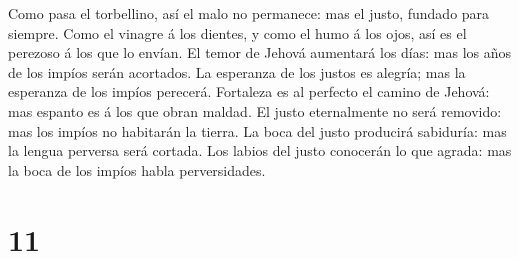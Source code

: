 Como pasa el torbellino, así el malo no permanece: mas el justo, fundado
para siempre.  Como el vinagre á los dientes, y como el
humo á los ojos, así es el perezoso á los que lo envían. 
El temor de Jehová aumentará los días: mas los años de los impíos serán
acortados.  La esperanza de los justos es alegría; mas la
esperanza de los impíos perecerá.  Fortaleza es al
perfecto el camino de Jehová: mas espanto es á los que obran maldad.
 El justo eternalmente no será removido: mas los impíos
no habitarán la tierra.  La boca del justo producirá
sabiduría: mas la lengua perversa será cortada.  Los
labios del justo conocerán lo que agrada: mas la boca de los impíos
habla perversidades.

\hypertarget{section-10}{%
\section{11}\label{section-10}}

